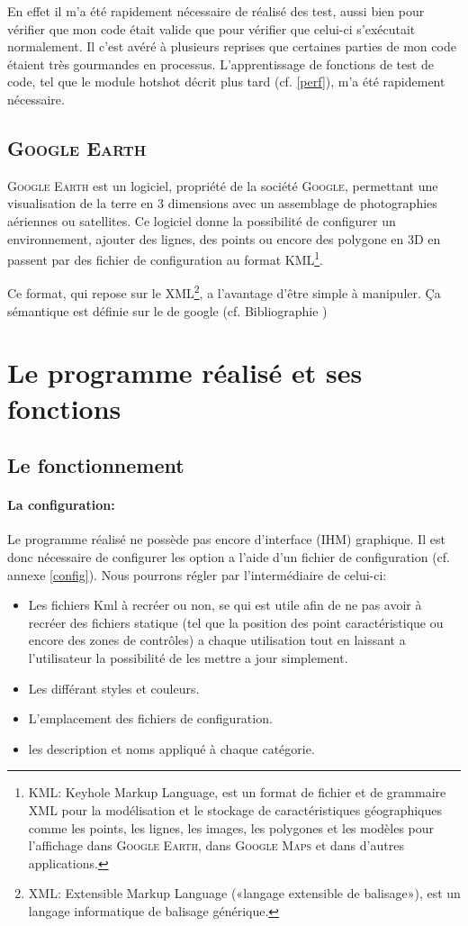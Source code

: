 En effet il m'a été rapidement nécessaire de réalisé des test, aussi bien pour vérifier que mon code était valide que pour vérifier que celui-ci s’exécutait normalement. Il c'est avéré à plusieurs reprises que certaines parties de mon code étaient très gourmandes en processus. L’apprentissage de fonctions de test de code, tel que le module hotshot décrit plus tard (cf. \vref{perf}), m'a été rapidement nécessaire.

    \subsection{\textsc{Google Earth}}
\textsc{Google Earth} est un logiciel, propriété de la société \textsc{Google}, permettant une visualisation de la terre en 3 dimensions avec un assemblage de photographies aériennes ou satellites. Ce logiciel donne la possibilité de configurer un environnement, ajouter des lignes, des points ou encore des polygone en 3D en passent par des fichier de configuration au format KML\footnote{\label{Kml}KML: Keyhole Markup Language, est un format de fichier et de grammaire XML pour la modélisation et le stockage de caractéristiques géographiques comme les points, les lignes, les images, les polygones et les modèles pour l'affichage dans \textsc{Google Earth}, dans \textsc{Google Maps} et dans d'autres applications.}.

Ce format, qui repose sur le XML\footnote{XML: Extensible Markup Language («langage extensible de balisage»), est un langage informatique de balisage générique.}, a l'avantage d’être simple à manipuler. Ça sémantique est définie sur le de google (cf. Bibliographie \cite{gecode}) 



\section{Le programme réalisé et ses fonctions}
    \subsection{Le fonctionnement\label{fonctionnement}}
            \paragraph{La configuration:}
Le programme réalisé ne possède pas encore d'interface (IHM) graphique. Il est donc nécessaire de configurer les option a l'aide d'un fichier de configuration (cf. annexe \vref{config}). Nous pourrons régler par l'intermédiaire de celui-ci:
\begin{itemize}
    \item Les fichiers Kml à recréer ou non, se qui est utile afin de ne pas avoir à recréer des fichiers statique (tel que la position des point caractéristique ou encore des zones de contrôles) a chaque utilisation tout en laissant a l'utilisateur la possibilité de les mettre a jour simplement.
    \item Les différant styles et couleurs.
    \item L'emplacement des fichiers de configuration.
    \item les description et noms appliqué à chaque catégorie.
\end{itemize}\medskip
